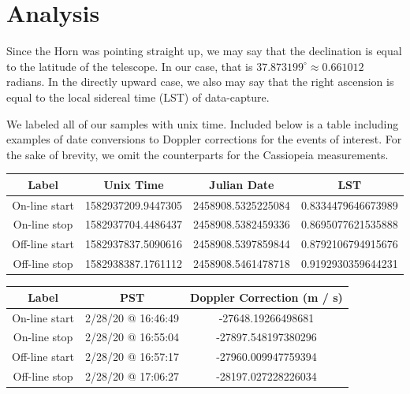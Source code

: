 \documentclass[12pt]{article}
\begin{document}
\section{Analysis}

\quad \quad Since the Horn was pointing straight up, we may say that the declination is equal to the latitude of the telescope. In our case, that is $37.873199^\circ \approx 0.661012$ radians. In the directly upward case, we also may say that the right ascension is equal to the local sidereal time (LST) of data-capture. %

We labeled all of our samples with unix time. Included below is a table including examples of date conversions to Doppler corrections for the events of interest. For the sake of brevity, we omit the counterparts for the Cassiopeia measurements.

\begin{center}
 \begin{tabular}{||c c c c||} 
 \hline
 Label & Unix Time & Julian Date & LST \\ [0.5ex] 
 \hline
 On-line start & 1582937209.9447305 & 2458908.5325225084 & 0.8334479646673989 \\ 
 \hline
 On-line stop & 1582937704.4486437 & 2458908.5382459336 & 0.8695077621535888 \\
 \hline
 Off-line start & 1582937837.5090616 & 2458908.5397859844 & 0.8792106794915676 \\
 \hline
 Off-line stop & 1582938387.1761112 & 2458908.5461478718 & 0.9192930359644231 \\ [1ex] 
 \hline
\end{tabular}
\end{center}

\begin{center}
 \begin{tabular}{||c c c||} 
 \hline
 Label & PST & Doppler Correction (m / s)\\ [0.5ex] 
 \hline
 On-line start & 2/28/20 @ 16:46:49 & -27648.19266498681 \\ 
 \hline
 On-line stop & 2/28/20 @ 16:55:04 & -27897.548197380296 \\
 \hline
 Off-line start & 2/28/20 @ 16:57:17 & -27960.009947759394 \\
 \hline
 Off-line stop & 2/28/20 @ 17:06:27 & -28197.027228226034 \\ [1ex] 
 \hline
\end{tabular}
\end{center}
\end{document}

